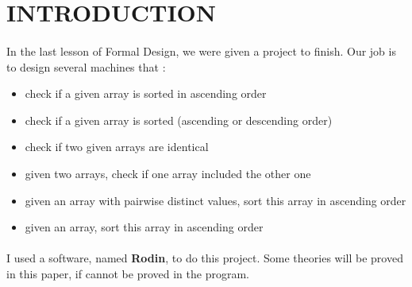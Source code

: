 \section{INTRODUCTION}

\paragraph{}
In the last lesson of Formal Design, we were given a project to finish. Our job is to design several machines that :

\begin{itemize}
\item check if a given array is sorted in ascending order
\item check if a given array is sorted (ascending or descending order)
\item check if two given arrays are identical
\item given two arrays, check if one array included the other one
\item given an array with pairwise distinct values, sort this array in ascending order
\item given an array, sort this array in ascending order
\end{itemize}

\paragraph{}
I used a software, named \textbf{Rodin}, to do this project. Some theories will be proved in this paper, if cannot be proved in the program.